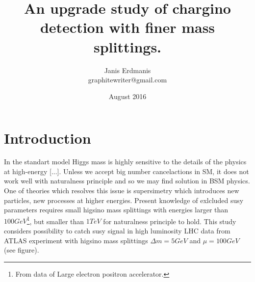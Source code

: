 \documentclass[tightenline,notitlepage,nofootinbib]{revtex4-1}
\begin{document}
  \title{An upgrade study of chargino detection with finer mass splittings.}
  \author{Janis Erdmanis \\ graphitewriter@gmail.com}
  \date{August 2016}
  \maketitle

  \section{Introduction}

  In the standart model Higgs mass is highly sensitive to the details of the physics at high-energy [...]. Unless we accept big number cancelactions in SM, it does not work well with naturalness principle and so we may find solution in BSM physics. One of theories which resolves this issue is supersimetry which introduces new particles, new processes at higher energies. Present knowledge of exlcluded susy parameters requires small higsino mass splittings with energies larger than $100 GeV$\footnote{From data of Large electron positron accelerator.}, but smaller than $1 TeV$ for naturalness principle to hold. This study considers possibility to catch susy signal in high luminosity LHC data from ATLAS experiment with higsino mass splittings $\Delta m = 5 GeV$ and $\mu=100 GeV$ (see figure).
\end{document}
